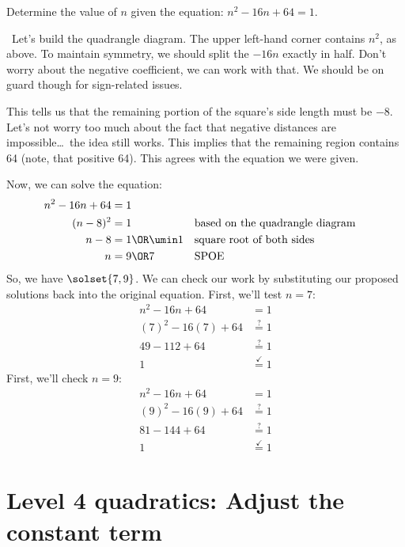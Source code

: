 \begin{boxedex}
Determine the value of $n$ given the equation: $n^2 - 16n + 64 = 1$.

\exsoln\ Let's build the quadrangle diagram. The upper left-hand corner contains $n^2$, as above. To maintain symmetry, we should split the $-16n$ exactly in half. Don't worry about the negative coefficient, we can work with that. We should be on guard though for sign-related issues.


This tells us that the remaining portion of the square's side length must be $-8$. Let's not worry too much about the fact that negative distances are impossible\ldots\ the idea still works. This implies that the remaining region contains 64 (note, that positive 64). This agrees with the equation we were given.


Now, we can solve the equation:
\begin{align*}
n^2 -16n +64 &= 1
\\
(n-8)^2 &= 1
&&\text{based on the quadrangle diagram}
\\
n-8 &= 1 \OR \umin1
&&\text{square root of both sides}
\\
n &= 9 \OR 7
&&\text{SPOE}
\end{align*}
So, we have $\solset{7,9}$. We can check our work by substituting our proposed solutions back into the original equation. First, we'll test $n=7$:
\begin{align*}
n^2 -16n +64 &= 1
\\
(7)^2 - 16(7) + 64 &\overset{?}{=} 1
\\
49 - 112 + 64 &\overset{?}{=} 1
\\
1 &\overset{\checkmark}{=} 1
\end{align*}
First, we'll check $n=9$:
\begin{align*}
n^2 -16n +64 &= 1
\\
(9)^2 - 16(9) + 64 &\overset{?}{=} 1
\\
81 - 144 + 64 &\overset{?}{=} 1
\\
1 &\overset{\checkmark}{=} 1
\end{align*}
\end{boxedex}

\section{Level 4 quadratics: Adjust the constant term}

